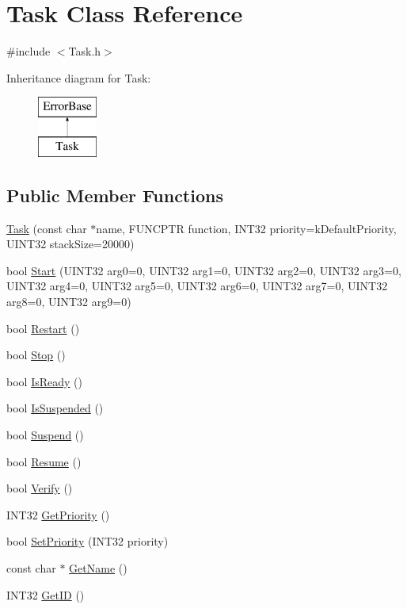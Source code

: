 \hypertarget{classTask}{
\section{Task Class Reference}
\label{classTask}
}


{\ttfamily \#include $<$Task.h$>$}

Inheritance diagram for Task:\begin{figure}[H]
\begin{center}
\leavevmode
\includegraphics[height=2.000000cm]{classTask}
\end{center}
\end{figure}
\subsection*{Public Member Functions}
\begin{DoxyCompactItemize}
\item 
\hyperlink{classTask_afb7c8a69ecb923df1e787c46be887c8d}{Task} (const char $\ast$name, FUNCPTR function, INT32 priority=kDefaultPriority, UINT32 stackSize=20000)
\item 
bool \hyperlink{classTask_aed180b79ad986ff5e55170400db3c226}{Start} (UINT32 arg0=0, UINT32 arg1=0, UINT32 arg2=0, UINT32 arg3=0, UINT32 arg4=0, UINT32 arg5=0, UINT32 arg6=0, UINT32 arg7=0, UINT32 arg8=0, UINT32 arg9=0)
\item 
bool \hyperlink{classTask_a5d2cbfc4103f71c3b64c53fee0e717c7}{Restart} ()
\item 
bool \hyperlink{classTask_a552b56dc92a117812a9ae3f24320eede}{Stop} ()
\item 
bool \hyperlink{classTask_ac4744fa610b1608e6c9f0f15d1b8658d}{IsReady} ()
\item 
bool \hyperlink{classTask_a6bddcf6b3e0ba32dcfac642ab71b2780}{IsSuspended} ()
\item 
bool \hyperlink{classTask_a546b3b5521b6093b1d30a41fc216d70c}{Suspend} ()
\item 
bool \hyperlink{classTask_a600addb28efe217d2cbdcf4a6776faec}{Resume} ()
\item 
bool \hyperlink{classTask_af3367e19bf2d011c8de81a8064b7c0f4}{Verify} ()
\item 
INT32 \hyperlink{classTask_af9db55d77496182dbd7798326c7c50b9}{GetPriority} ()
\item 
bool \hyperlink{classTask_aab7f714e8bbe56738a377b551b65abea}{SetPriority} (INT32 priority)
\item 
const char $\ast$ \hyperlink{classTask_a187f61cd431240c24402b4e76904dfb8}{GetName} ()
\item 
INT32 \hyperlink{classTask_a39b2ed461b0667ec87dc62abdcde3a05}{GetID} ()
\end{DoxyCompactItemize}

